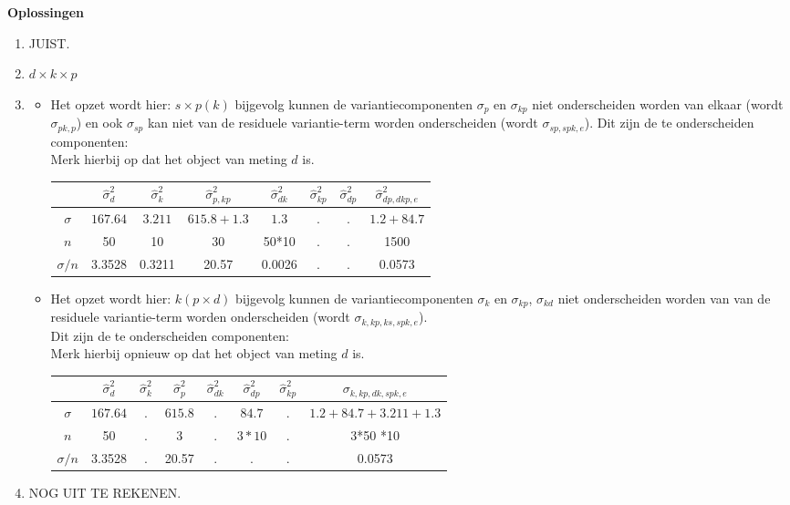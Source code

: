 \OPLOSSING
{
\textbf{Oplossingen}
\begin{enumerate}
\item JUIST.
\item $d \times k \times p$
\item
\begin{itemize}
	\item Het opzet wordt hier: $s\times p\left(k\right)$ bijgevolg kunnen de variantiecomponenten $\sigma_p$ en $\sigma_{kp}$ niet onderscheiden worden van elkaar (wordt $\sigma_{pk,p}$) en ook $\sigma_{sp}$ kan niet van de residuele variantie-term worden onderscheiden (wordt $\sigma_{sp, spk,e}$). Dit zijn de te onderscheiden componenten:\\ Merk hierbij op dat het object van meting $d$ is. \\
	\begin{tabular}{|c|c|c|c|c|c|c|c|} \hline
	 & $ \hat{\sigma}^2_{d}$ & $ \hat{\sigma}^2_{k} $& $ \hat{\sigma}^2_{p,kp} $ & $ \hat{\sigma}^2_{dk}$ & $\hat{\sigma}^2_{kp} $ & $ \hat{\sigma}^2_{dp} $& $ \hat{\sigma}^2_{dp, dkp, e} $ \\ \hline
	$\sigma$  			& $ 167.64 $ 			& $ 3.211 $ 			& $615.8+1.3  $ 			& $ 1.3 $				 & $. $	& $ . $& $ 1.2 + 84.7  $ \\
	$n$ 				& 50					& 10					& 30				 		& 50*10			  		 & $. $	& $ . $&  1500 \\ \hline
	$\sigma / n$ 		& 3.3528				& 0.3211				& 20.57				 		& 0.0026			  	 & $. $	& $ . $&  0.0573 \\ \hline
	\end{tabular}
	\item Het opzet wordt hier: $k\left(p\times d\right)$ bijgevolg kunnen de variantiecomponenten $\sigma_k$ en $\sigma_{kp}$, $\sigma_{kd}$ niet onderscheiden worden van  van de residuele variantie-term worden onderscheiden (wordt $\sigma_{k, kp, ks, spk, e}$).\\Dit zijn de te onderscheiden componenten:\\ Merk hierbij opnieuw op dat het object van meting $d$ is. \\
	\begin{tabular}{|c|c|c|c|c|c|c|c|} \hline
	 & $ \hat{\sigma}^2_{d} $ & $ \hat{\sigma}^2_{k} $& $ \hat{\sigma}^2_{p} $ & $ \hat{\sigma}^2_{dk} $ & $ \hat{\sigma}^2_{dp} $ & $ \hat{\sigma}^2_{kp} $ & 
	 $\sigma_{k, kp, dk, spk, e}$ \\ \hline
	$\sigma$  			& $ 167.64 $ 			& $. $ 			& $615.8 $ 	  & $.$				 & $84.7 $	& $ . $& $ 1.2 + 84.7 +  3.211 +1.3$ \\
	$n$ 				& 50					& $.$			& 3			  & $.$		  		 & $3*10$		& $ . $&  3*50 *10 \\ \hline
	$\sigma / n$        & 3.3528				& $. $			& 20.57		  & $.$			  	 & $. $		& $ . $&  0.0573 \\ \hline
	\end{tabular}
\end{itemize}
\item NOG UIT TE REKENEN.
\end{enumerate}
}
